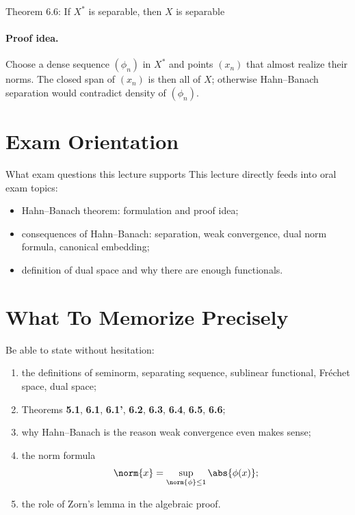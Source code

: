 \documentclass[11pt]{article}
\begin{document}
\begin{thmbox}{Theorem 6.6: If $X^*$ is separable, then $X$ is separable}
\thmDualSeparableImpliesSeparable
\end{thmbox}

\paragraph{Proof idea.}
Choose a dense sequence $(\phi_n)$ in $X^*$ and points $(x_n)$ that almost realize their norms. The closed span of $(x_n)$ is then all of $X$; otherwise Hahn--Banach separation would contradict density of $(\phi_n)$.

\section{Exam Orientation}

\begin{warningbox}{What exam questions this lecture supports}
This lecture directly feeds into oral exam topics:
\begin{itemize}
\item Hahn--Banach theorem: formulation and proof idea;
\item consequences of Hahn--Banach: separation, weak convergence, dual norm formula, canonical embedding;
\item definition of dual space and why there are enough functionals.
\end{itemize}
\end{warningbox}

\section{What To Memorize Precisely}

\begin{focusbox}
Be able to state without hesitation:
\begin{enumerate}
\item the definitions of seminorm, separating sequence, sublinear functional, Fr\'echet space, dual space;
\item Theorems \textbf{5.1}, \textbf{6.1}, \textbf{6.1'}, \textbf{6.2}, \textbf{6.3}, \textbf{6.4}, \textbf{6.5}, \textbf{6.6};
\item why Hahn--Banach is the reason weak convergence even makes sense;
\item the norm formula
\[
\norm{x}=\sup_{\norm{\phi}\le 1}\abs{\phi(x)};
\]
\item the role of Zorn's lemma in the algebraic proof.
\end{enumerate}
\end{focusbox}
\end{document}
